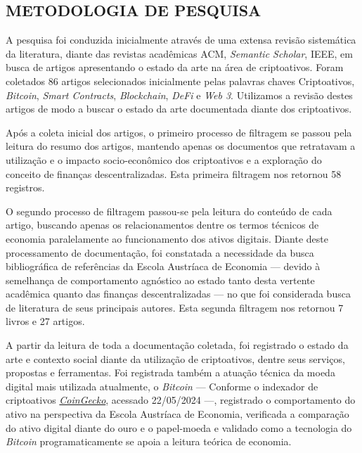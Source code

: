 \documentclass[article,12pt,oneside,a4paper,english,brazil]{unifil}
\begin{document}
\begin{Spacing}{1.5}

\section*{METODOLOGIA DE PESQUISA}
A pesquisa foi conduzida inicialmente através de uma extensa revisão sistemática da literatura, diante das revistas acadêmicas ACM, \textit{Semantic Scholar}, IEEE, em busca de artigos apresentando o estado da arte na área de criptoativos. Foram coletados 86 artigos selecionados inicialmente pelas palavras chaves Criptoativos, \textit{Bitcoin}, \textit{Smart Contracts}, \textit{Blockchain}, \textit{DeFi} e \textit{Web 3}. Utilizamos a revisão destes artigos de modo a buscar o estado da arte documentada diante dos criptoativos.

Após a coleta inicial dos artigos, o primeiro processo de filtragem se passou pela leitura do resumo dos artigos, mantendo apenas os documentos que retratavam a utilização e o impacto socio-econômico dos criptoativos e a exploração do conceito de finanças descentralizadas. Esta primeira filtragem nos retornou 58 registros.

O segundo processo de filtragem passou-se pela leitura do conteúdo de cada artigo, buscando apenas os relacionamentos dentre os termos técnicos de economia paralelamente ao funcionamento dos ativos digitais. Diante deste processamento de documentação, foi constatada a necessidade da busca bibliográfica de referências da Escola Austríaca de Economia — devido à semelhança de comportamento agnóstico ao estado tanto desta vertente acadêmica quanto das finanças descentralizadas — no que foi considerada busca de literatura de seus principais autores. Esta segunda filtragem nos retornou 7 livros e 27 artigos.

A partir da leitura de toda a documentação coletada, foi registrado o estado da arte e contexto social diante da utilização de criptoativos, dentre seus serviços, propostas e ferramentas. Foi registrada também a atuação técnica da moeda digital mais utilizada atualmente, o \textit{Bitcoin} — Conforme o indexador de criptoativos \href{https://www.coingecko.com/pt}{\textit{CoinGecko}}, acessado 22/05/2024 —, registrado o comportamento do ativo na perspectiva da Escola Austríaca de Economia, verificada a comparação do ativo digital diante do ouro e o papel-moeda e validado como a tecnologia do \textit{Bitcoin} programaticamente se apoia a leitura teórica de economia.


\end{Spacing}
\end{document}
